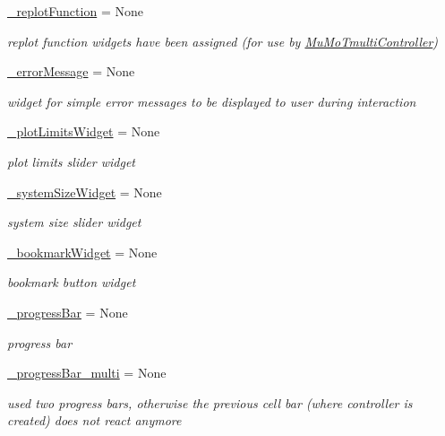 \begin{DoxyCompactItemize}
\hyperlink{class_mu_mo_t_1_1_mu_mo_t_1_1_mu_mo_tcontroller_a04e66f2b7e3c67b0e96f318acbfa7f0e}{\+\_\+replot\+Function} = None
\begin{DoxyCompactList}\small\item\em replot function widgets have been assigned (for use by \hyperlink{class_mu_mo_t_1_1_mu_mo_t_1_1_mu_mo_tmulti_controller}{Mu\+Mo\+Tmulti\+Controller}) \end{DoxyCompactList}\item 
\hyperlink{class_mu_mo_t_1_1_mu_mo_t_1_1_mu_mo_tcontroller_afb9cc1f1f0c08393b454f526842425cc}{\+\_\+error\+Message} = None
\begin{DoxyCompactList}\small\item\em widget for simple error messages to be displayed to user during interaction \end{DoxyCompactList}\item 
\hyperlink{class_mu_mo_t_1_1_mu_mo_t_1_1_mu_mo_tcontroller_a7f7ea1e7e5688cb25a6651783db498e0}{\+\_\+plot\+Limits\+Widget} = None
\begin{DoxyCompactList}\small\item\em plot limits slider widget \end{DoxyCompactList}\item 
\hyperlink{class_mu_mo_t_1_1_mu_mo_t_1_1_mu_mo_tcontroller_ab1e13c5ff312caa1398f9de296be2319}{\+\_\+system\+Size\+Widget} = None
\begin{DoxyCompactList}\small\item\em system size slider widget \end{DoxyCompactList}\item 
\hyperlink{class_mu_mo_t_1_1_mu_mo_t_1_1_mu_mo_tcontroller_ae7a084d9f77bbda4a99577633ef002ce}{\+\_\+bookmark\+Widget} = None
\begin{DoxyCompactList}\small\item\em bookmark button widget \end{DoxyCompactList}\item 
\hyperlink{class_mu_mo_t_1_1_mu_mo_t_1_1_mu_mo_tcontroller_a018864aa22d2adb0d3958fb0adbce8e2}{\+\_\+progress\+Bar} = None
\begin{DoxyCompactList}\small\item\em progress bar \end{DoxyCompactList}\item 
\hyperlink{class_mu_mo_t_1_1_mu_mo_t_1_1_mu_mo_tcontroller_a1da52cde6b2b94a1005eaa6898d2f8c5}{\+\_\+progress\+Bar\+\_\+multi} = None
\begin{DoxyCompactList}\small\item\em used two progress bars, otherwise the previous cell bar (where controller is created) does not react anymore \end{DoxyCompactList}\end{DoxyCompactItemize}



